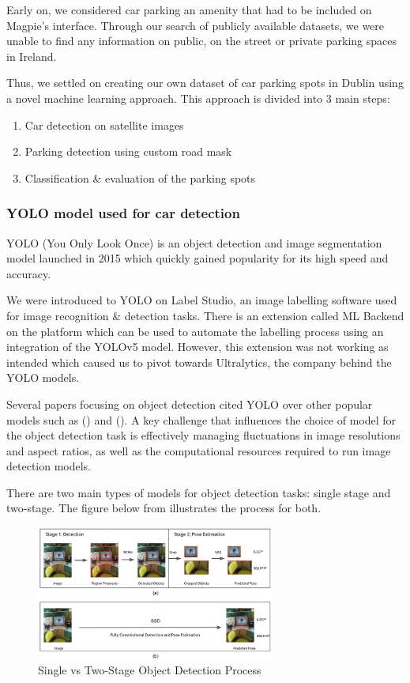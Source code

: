 Early on, we considered car parking an amenity that had to be included on
Magpie's interface. Through our search of publicly available datasets, we were
unable to find any information on public, on the street or private parking
spaces in Ireland.

Thus, we settled on creating our own dataset of car parking spots in Dublin
using a novel machine learning approach.
This approach is divided into 3 main steps:
\begin{enumerate}
  \item Car detection on satellite images
  \item Parking detection using custom road mask
  \item Classification \& evaluation of the parking spots
\end{enumerate}
\subsubsection{YOLO model used for car detection}
YOLO (You Only Look Once) is an object detection and image segmentation model
launched in 2015 which quickly gained popularity for its high speed and
accuracy.

We were introduced to YOLO on Label Studio, an image labelling software used for
image recognition \& detection tasks. There is an extension called ML Backend on
the platform which can be used to automate the labelling process using an
integration of the YOLOv5 model. However, this extension was not working as
intended which caused us to pivot towards Ultralytics, the company behind the
YOLO models.

Several papers focusing on object detection cited YOLO over other popular models
such as (\cite{firedetectionYOLO}) and (\cite{polypdetectionYOLO}). A key
challenge that influences the choice of model for the object detection task is
effectively managing fluctuations in image resolutions and aspect ratios, as
well as the computational resources required to run image detection models.

There are two main types of models for object detection tasks: single stage and
two-stage. The figure below from \cite{singlevstwodetectorimg} illustrates the
process for both.

\begin{figure}[htbp]
  \centering
  \includegraphics[width=0.7\textwidth]{images/single-vs-two-stage-obj-detector.png}
  \caption{Single vs Two-Stage Object Detection Process}
\end{figure}

